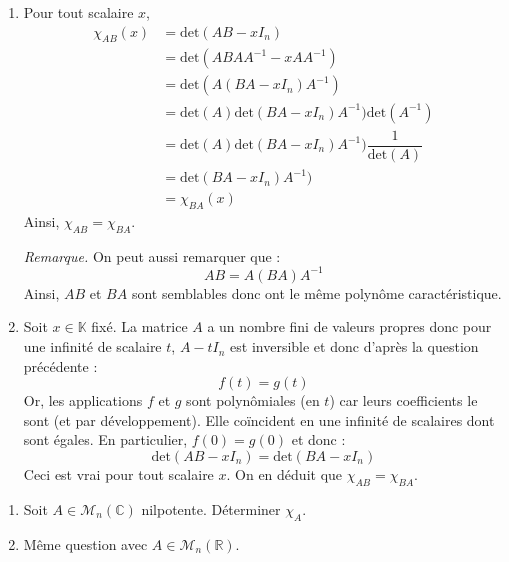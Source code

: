 \documentclass[a4paper,10pt]{report}
\begin{document}
\begin{enumerate}
\item Pour tout scalaire $x$,
\begin{align*}
\chi_{AB}(x) & = \textrm{det}(AB-xI_n) \\
& = \textrm{det}(ABAA^{-1}-xA A^{-1}) \\
& = \textrm{det}(A(BA-xI_n) A^{-1}) \\
& = \textrm{det}(A)\textrm{det}(BA-xI_n) A^{-1})\textrm{det}(A^{-1}) \\
& = \textrm{det}(A)\textrm{det}(BA-xI_n) A^{-1}) \dfrac{1}{\textrm{det}(A)} \\
& = \textrm{det}(BA-xI_n) A^{-1}) \\
& = \chi_{BA}(x)
\end{align*}
Ainsi, $\chi_{AB}= \chi_{BA}$.

\medskip

\noindent \textit{Remarque.} On peut aussi remarquer que :
$$ AB=  A(BA)A^{-1}$$
Ainsi, $AB$ et $BA$ sont semblables donc ont le même polynôme caractéristique.
\item Soit $x \in \mathbb{K}$ fixé. La matrice $A$ a un nombre fini de valeurs propres donc pour une infinité de scalaire $t$, $A-t I_n$ est inversible et donc d'après la question précédente :
$$ f(t)=g(t)$$
Or, les applications $f$ et $g$ sont polynômiales (en $t$) car leurs coefficients le sont (et par développement). Elle coïncident en une infinité de scalaires dont sont égales. En particulier, $f(0)=g(0)$ et donc :
$$ \textrm{det}(AB-xI_n)= \textrm{det}(BA-xI_n)$$
Ceci est vrai pour tout scalaire $x$. On en déduit que $\chi_{AB}= \chi_{BA}$.
\end{enumerate}

\begin{Exercice}{}
  \begin{enumerate}
  \item  Soit $A \in \mathcal{M}_{n}(\mathbb{C})$ nilpotente. Déterminer $\chi_{A}$.
  \item Même question avec $A \in \mathcal{M}_{n}(\mathbb{R})$.
  \end{enumerate}
\end{Exercice} 

\corr 
\end{document}
